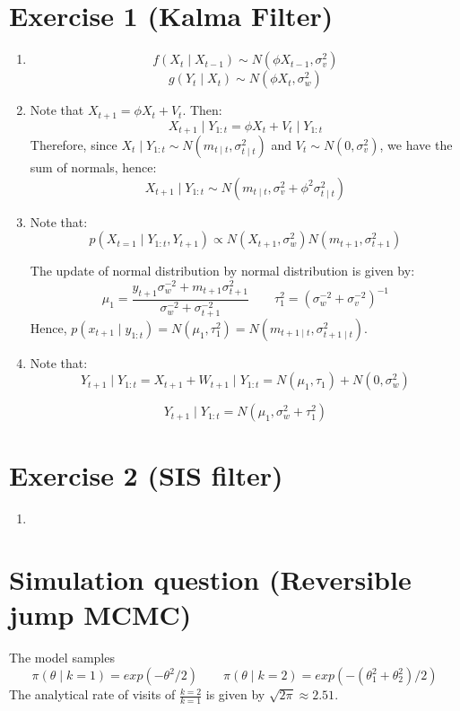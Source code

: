 \documentclass[12pt,letterpaper]{article}
\begin{document}

\section*{Exercise 1 (Kalma Filter)}
\begin{enumerate}[leftmargin=!,labelindent=5pt]
\item 
$$
f(X_t \mid X_{t-1}) \sim N(\phi X_{t-1}, \sigma_v^2)
$$
$$
g(Y_t \mid X_{t}) \sim N(\phi X_{t}, \sigma_w^2)
$$

\item Note that $X_{t+1} = \phi X_t + V_t$. Then:
$$
X_{t+1} \mid Y_{1:t} = \phi X_t + V_t \mid Y_{1:t}
$$
Therefore, since
$X_t \mid Y_{1:t} \sim N(m_{t\mid t}, \sigma^2_{t\mid t})$ and
$V_t \sim N(0, \sigma_v^2)$, we have the sum of normals, hence:
$$
X_{t+1} \mid Y_{1:t} \sim N(m_{t\mid t}, \sigma_v^2 +
\phi^2 \sigma^2_{t\mid t})
$$

\item Note that:
$$
p(X_{t=1} \mid Y_{1:t},Y_{t+1}) \propto
N(X_{t+1},\sigma_w^2)N(m_{t+1}, \sigma_{t+1}^2)
$$

The update of normal distribution by normal distribution is given by:
$$
\mu_1 = \frac{y_{t+1}\sigma_w ^{-2} + m_{t+1}\sigma_{t+1}^2}
{\sigma_w^{-2} + \sigma_{t+1}^{-2}}
\quad \quad
\tau_1^2 = (\sigma_w^{-2}+\sigma_v^{-2})^{-1}
$$
Hence, $p(x_{t+1} \mid y_{1:t}) = N(\mu_1, \tau_1^2) =
N(m_{t+1\mid t},\sigma^2_{t+1 \mid t})$.

\item Note that:
$$
Y_{t+1} \mid Y_{1:t} = X_{t+1} + W_{t+1} \mid Y_{1:t} =
N(\mu_1,\tau_1) + N(0, \sigma_w ^2)
$$

$$
Y_{t+1} \mid Y_{1:t} = N(\mu_1,
\sigma_w^2 + \tau_1^2)
$$

\end{enumerate}

\newpage
\section*{Exercise 2 (SIS filter)}
\begin{enumerate}[leftmargin=!,labelindent=5pt]
\item
\end{enumerate}



\newpage
\section*{Simulation question (Reversible jump MCMC)}
The model samples
$$
\pi(\theta \mid k=1) = exp(-\theta^2/2)
\quad \quad
\pi(\theta \mid k=2) = exp(-(\theta_1^2 + \theta_2^2)/2)
$$
The analytical rate of visits of $\frac{k=2}{k=1}$
is given by $\sqrt{2\pi} \approx 2.51$.
\end{document}

